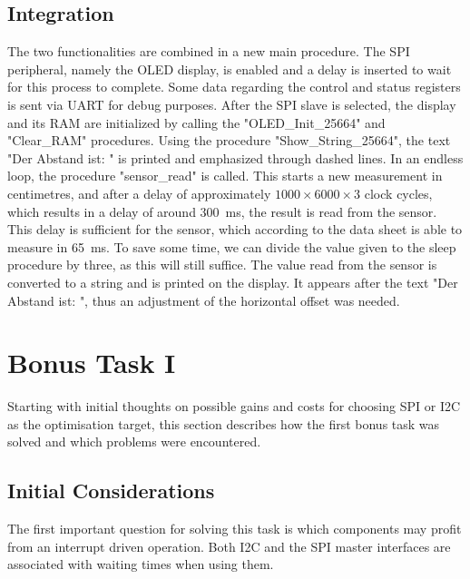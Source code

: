 		\subsection{Integration} %
		\label{sub:integration}
			The two functionalities are combined in a new main procedure. The SPI peripheral, namely the OLED display, is enabled and a delay is inserted to wait for this process to complete. Some data regarding the control and status registers is sent via UART for debug purposes. After the SPI slave is selected, the display and its RAM are initialized by calling the "OLED\_Init\_25664" and "Clear\_RAM" procedures. Using the procedure "Show\_String\_25664", the text "Der Abstand ist: " is printed and emphasized through dashed lines. 
			In an endless loop, the procedure "sensor\_read" is called. This starts a new measurement in centimetres, and after a delay of approximately 
			\begin{math} 
				1000 \times 6000 \times 3 
			\end{math} 
			clock cycles, which results in a delay of around \SI{300}{\milli\second}, the result is read from the sensor. This delay is sufficient for the sensor, which according to the data sheet is able to measure in \SI{65}{\milli\second}. To save some time, we can divide the value given to the sleep procedure by three, as this will still suffice. The value read from the sensor is converted to a string and is printed on the display. It appears after the text "Der Abstand ist: ", thus an adjustment of the horizontal offset was needed.

	\section{Bonus Task I} %
	\label{sec:impl_bonus_task_1}
		Starting with initial thoughts on possible gains and costs for choosing SPI or I2C as the optimisation target, this section describes how the first bonus task was solved and which problems were encountered.

		\subsection{Initial Considerations} %
		\label{sub:initial_considerations}
			The first important question for solving this task is which components may profit from an interrupt driven operation. Both I2C and the SPI master interfaces are associated with waiting times when using them. 


